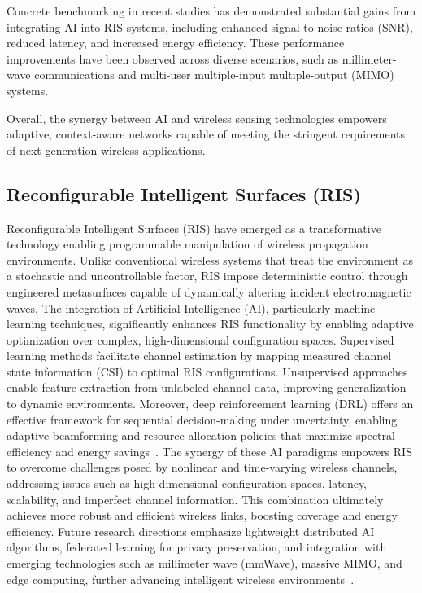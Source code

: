 \documentclass[sigconf]{acmart}
\begin{document}
Concrete benchmarking in recent studies has demonstrated substantial gains from integrating AI into RIS systems, including enhanced signal-to-noise ratios (SNR), reduced latency, and increased energy efficiency. These performance improvements have been observed across diverse scenarios, such as millimeter-wave communications and multi-user multiple-input multiple-output (MIMO) systems.

Overall, the synergy between AI and wireless sensing technologies empowers adaptive, context-aware networks capable of meeting the stringent requirements of next-generation wireless applications.

\subsection{Reconfigurable Intelligent Surfaces (RIS)}

Reconfigurable Intelligent Surfaces (RIS) have emerged as a transformative technology enabling programmable manipulation of wireless propagation environments. Unlike conventional wireless systems that treat the environment as a stochastic and uncontrollable factor, RIS impose deterministic control through engineered metasurfaces capable of dynamically altering incident electromagnetic waves. The integration of Artificial Intelligence (AI), particularly machine learning techniques, significantly enhances RIS functionality by enabling adaptive optimization over complex, high-dimensional configuration spaces. Supervised learning methods facilitate channel estimation by mapping measured channel state information (CSI) to optimal RIS configurations. Unsupervised approaches enable feature extraction from unlabeled channel data, improving generalization to dynamic environments. Moreover, deep reinforcement learning (DRL) offers an effective framework for sequential decision-making under uncertainty, enabling adaptive beamforming and resource allocation policies that maximize spectral efficiency and energy savings~\cite{ref49}. The synergy of these AI paradigms empowers RIS to overcome challenges posed by nonlinear and time-varying wireless channels, addressing issues such as high-dimensional configuration spaces, latency, scalability, and imperfect channel information. This combination ultimately achieves more robust and efficient wireless links, boosting coverage and energy efficiency. Future research directions emphasize lightweight distributed AI algorithms, federated learning for privacy preservation, and integration with emerging technologies such as millimeter wave (mmWave), massive MIMO, and edge computing, further advancing intelligent wireless environments~\cite{ref49}.
\end{document}
